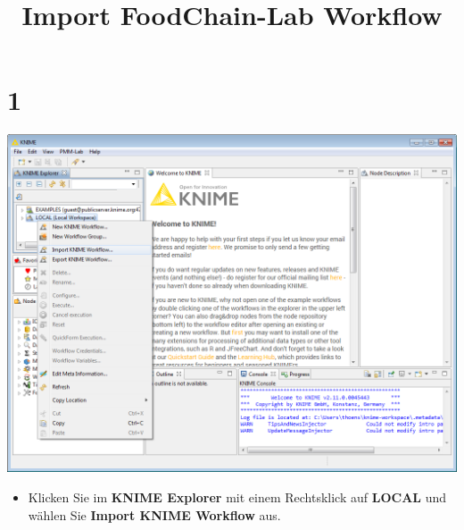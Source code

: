 \documentclass{beamer}
\title{Import FoodChain-Lab Workflow}
\date{}
\begin{document}
\maketitle
 
\section{1}
\begin{frame}
	\begin{center}
  		\includegraphics[height=0.6\textheight]{1.png}
	\end{center}
	\begin{itemize}
		\item Klicken Sie im \textbf{KNIME Explorer} mit einem Rechtsklick auf \textbf{LOCAL} und wählen Sie \textbf{Import KNIME Workflow} aus.
	\end{itemize}
\end{frame}
\end{document}
